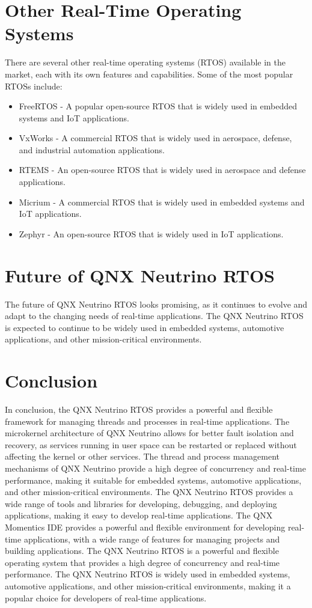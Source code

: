 \documentclass{article}
\begin{document}
\section{Other Real-Time Operating Systems}
\label{sec:other-rtos}
There are several other real-time operating systems (RTOS) available in the market, each with its own features and capabilities. Some of the most popular RTOSs include:
\begin{itemize}
    \item  FreeRTOS - A popular open-source RTOS that is widely used in embedded systems and IoT applications.
    \item  VxWorks - A commercial RTOS that is widely used in aerospace, defense, and industrial automation applications.
    \item  RTEMS - An open-source RTOS that is widely used in aerospace and defense applications.
    \item  Micrium - A commercial RTOS that is widely used in embedded systems and IoT applications.
    \item  Zephyr - An open-source RTOS that is widely used in IoT applications.
\end{itemize}
\section{Future of QNX Neutrino RTOS}
\label{sec:future-qnx}
The future of QNX Neutrino RTOS looks promising, as it continues to evolve and adapt to the changing needs of real-time applications.
The QNX Neutrino RTOS is expected to continue to be widely used in embedded systems, automotive applications, and other mission-critical environments.

\section{Conclusion}
\label{sec:conclusion}
In conclusion, the QNX Neutrino RTOS provides a powerful and flexible framework for managing threads and processes in real-time applications.
The microkernel architecture of QNX Neutrino allows for better fault isolation and recovery, as services running in user space can be restarted or replaced without affecting the kernel or other services.
The thread and process management mechanisms of QNX Neutrino provide a high degree of concurrency and real-time performance, making it suitable for embedded systems, automotive applications, and other mission-critical environments.
The QNX Neutrino RTOS provides a wide range of tools and libraries for developing, debugging, and deploying applications, making it easy to develop real-time applications.
The QNX Momentics IDE provides a powerful and flexible environment for developing real-time applications, with a wide range of features for managing projects and building applications.
The QNX Neutrino RTOS is a powerful and flexible operating system that provides a high degree of concurrency and real-time performance.
The QNX Neutrino RTOS is widely used in embedded systems, automotive applications, and other mission-critical environments, making it a popular choice for developers of real-time applications.
\end{document}

